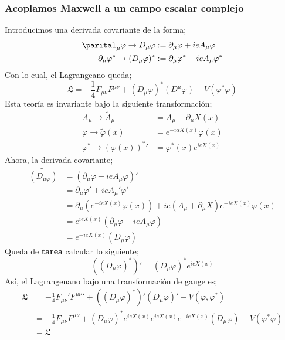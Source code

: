 \documentclass[../main.tex]{subfiles}
\begin{document}
   \subsubsection{Acoplamos Maxwell a un campo escalar complejo}
Introducimos una derivada covariante de la forma;
\begin{align}
  \parital_\mu \varphi \rightarrow D_\mu \varphi & := \partial_\mu \varphi +ie A_\mu \varphi\\
  \partial_\mu \varphi^* \rightarrow (D_\mu \varphi)^* & := \partial_\mu \varphi^* - ieA_\mu \varphi^*
 \end{align}
Con lo cual, el Lagrangeano queda;
\begin{equation}
  \mathfrak{L} = -\frac{1}{4} F_{\mu\nu}F^{\mu\nu} + \left( D_\mu\varphi \right)^* \left( D^\mu \varphi \right) - V(\varphi^*\varphi)
 \end{equation}
 Esta teoría es invariante bajo la siguiente transformación;
 \begin{align*}
   A_\mu \rightarrow \tilde{A}_\mu & = A_\mu + \partial_\mu X(x) \\
   \varphi \rightarrow \tilde{\varphi}(x) &= e^{-i\alpha X(x)} \varphi(x) \\
   \varphi^* \rightarrow \left( \varphi(x) \right)^*' & = \varphi^*(x) e^{ieX(x)}
 \end{align*}
 Ahora, la derivada covariante;
\begin{align*}
  \tilde{(D_{\mu\varphi})} & = \left( \partial_\mu \varphi + ieA_\mu\varphi \right)' \\
  & = \partial_\mu \varphi' + ieA_\mu'\varphi' \\
  & = \partial_\mu \left( e^{-ieX(x)} \varphi(x) \right)+ie \left( A_\mu + \partial_\mu X \right)e^{-ieX(x)}\varphi(x) \\
  & = e^{ieX(x)} \left( \partial_\mu \varphi + ie A_\mu \varphi \right) \\
  & = e^{-ieX(x)} \left( D_\mu \varphi \right)
\end{align*}
Queda de \textbf{tarea} calcular lo siguiente;
\begin{equation}
  \left( \left( D_\mu\varphi \right)^* \right)' = \left( D_\mu \varphi \right)^* e^{ieX(x)}
 \end{equation}
 Así, el Lagrangenano bajo una transformación de gauge es;
 \begin{align*}
   \mathfrak{L}& = -\frac{1}{4} F_{\mu\nu}'F^{\mu\nu}' + \left(\left( D_\mu \varphi \right)^* \right)' \left( D_\mu\varphi \right)' - V(\varphi,\varphi^*) \\
   & = -\frac{1}{4} F_{\mu\nu} F^{\mu\nu} + \left( D_\mu \varphi \right)^* e^{ieX(x)} e^{ieX(x)} e^{-ieX(x)} \left( D_\mu \varphi \right) - V(\varphi^*\varphi) \\
   & = \mathfrak{L}
 \end{align*}
\end{document}
